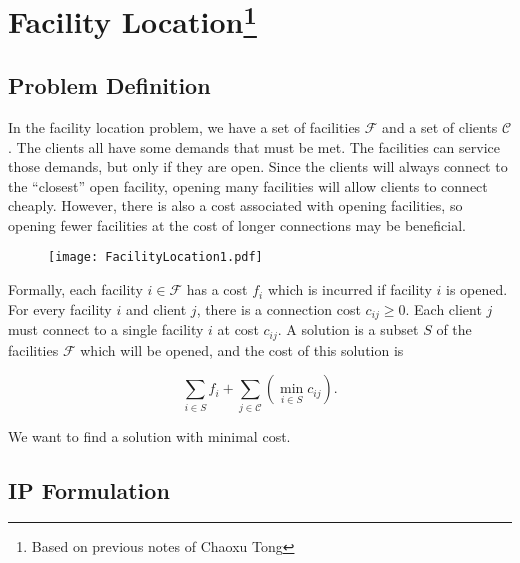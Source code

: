 \documentclass[11pt]{article}
\newcommand{\reals}{\mathbb{R}}
\newcommand{\scf}{\ensuremath{\mathcal{F}}\xspace}
\newcommand{\scc}{\ensuremath{\mathcal{C}}\xspace}
\begin{document}

\section*{Facility Location\footnote{Based on previous notes of Chaoxu Tong}}

\subsection*{Problem Definition}

In the facility location problem, we have a set of facilities $\scf$
and a set of clients $\scc$. The clients all have some demands that
must be met. The facilities can service those demands, but only if
they are open. Since the clients will always connect to the
``closest'' open facility, opening many facilities will allow
clients to connect cheaply. However, there is also a cost associated
with opening facilities, so opening fewer facilities at the cost of
longer connections may be beneficial.

\begin{figure}[h]
\centerline{
\texttt{[image: FacilityLocation1.pdf]}
}
\end{figure}

Formally, each facility $i \in \scf$ has a cost $f_i$ which is
incurred if facility $i$ is opened. For every facility $i$ and
client $j$, there is a connection cost $c_{ij}\geq0$. Each client $j$ must
connect to a single facility $i$ at cost $c_{ij}$. A solution is
a subset $S$ of the facilities $\scf$ which will be opened, and the
cost of this solution is

$$ \sum_{i \in S} f_i + \sum_{j \in \scc} \left( \min_{i \in S} c_{ij} \right).$$

We want to find a solution with minimal cost. %

\subsection*{IP Formulation}
\end{document}
